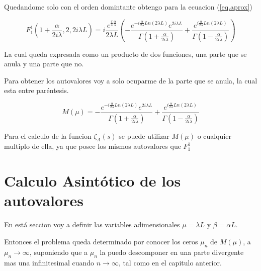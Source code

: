 Quedandome solo con el orden domintante obtengo para la ecuacion (\ref{eq.aprox}) %

\begin{equation}
    F _1 ^1 (1+  \frac{  \alpha}{2 i \lambda} ,2 ,2 i \lambda L  ) = 
   i  \frac{e ^{ \frac{\pi}{4} \frac{\alpha}{\lambda} } }{2 \lambda L}
    \left( -
    \frac{e ^{- i \frac{\alpha}{2 \lambda} Ln(2 \lambda L) } e ^{2 i \lambda L} }{\Gamma(1+\frac{ \alpha}{2 i \lambda})} +
    \frac{e ^{  i \frac{\alpha}{2 \lambda} Ln(2 \lambda L) }}               {\Gamma(1-\frac{ \alpha}{2 i \lambda})}
    \right)
\label{eq.completa}
\end{equation}




La cual queda expresada como un producto de dos funciones, una parte que se anula y una parte que no.

Para obtener los autovalores voy a solo ocuparme de la parte que se anula, la cual esta entre paréntesis.

\begin{equation}
    M (\mu) = 
    - \frac{e ^{- i \frac{\alpha}{2 \lambda} Ln(2 \lambda L) } e ^{2 i \lambda L} }{\Gamma(1+\frac{ \alpha}{2 i \lambda})} +
    \frac{e ^{  i \frac{\alpha}{2 \lambda} Ln(2 \lambda L) }}               {\Gamma(1-\frac{ \alpha}{2 i \lambda})}
\label{eq.aproxx}
\end{equation}

Para el calculo de la funcion $\zeta _A (s) $ se puede utilizar $M ( \mu )$ o cualquier multiplo de ella, ya que posee los mismos autovalores que $F_1 ^1 $




\section{Calculo Asintótico de los autovalores}


En está seccion voy a definir las variables adimensionales $\mu = \lambda L $ y $\beta = \alpha L$.

Entonces el problema queda determinado por conocer los ceros $\mu _n$ de $M(\mu)$, a $\mu _n \rightarrow{\infty}$, suponiendo que a $\mu _n$ la puedo descomponer en una parte divergente mas una infinitesimal cuando $n \rightarrow{\infty}$, tal como en el capitulo anterior.


